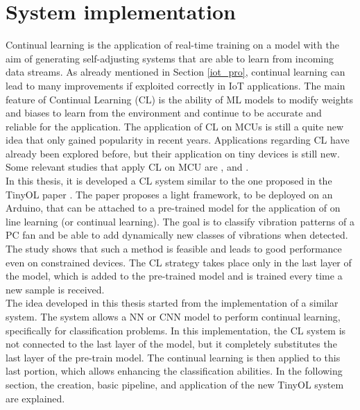 \documentclass[12pt]{report}
\begin{document}
\chapter{System implementation}
Continual learning is the application of real-time training on a model with the aim of generating self-adjusting systems that are able to learn from incoming data streams. As already mentioned in Section \ref{iot_pro}, continual learning can lead to many improvements if exploited correctly in IoT applications. The main feature of Continual Learning (CL) is the ability of ML models to modify weights and biases to learn from the environment and continue to be accurate and reliable for the application. The application of CL on MCUs is still a quite new idea that only gained popularity in recent years. Applications regarding CL have already been explored before, but their application on tiny devices is still new. Some relevant studies that apply CL on MCU are \cite{ren2021tinyol}, \cite{ren2021synergy} and \cite{sudharsan2021train++}. \\
In this thesis, it is developed a CL system similar to the one proposed in the TinyOL paper \cite{ren2021tinyol}. The paper proposes a light framework, to be deployed on an Arduino, that can be attached to a pre-trained model for the application of on line learning (or continual learning). The goal is to classify vibration patterns of a PC fan and be able to add dynamically new classes of vibrations when detected. The study shows that such a method is feasible and leads to good performance even on constrained devices. The CL strategy takes place only in the last layer of the model, which is added to the pre-trained model and is trained every time a new sample is received.\\
The idea developed in this thesis started from the implementation of a similar system. The system allows a NN or CNN model to perform continual learning, specifically for classification problems. In this implementation, the CL system is not connected to the last layer of the model, but it completely substitutes the last layer of the pre-train model. The continual learning is then applied to this last portion, which allows enhancing the classification abilities. In the following section, the creation, basic pipeline, and application of the new TinyOL system are explained. 
\end{document}
